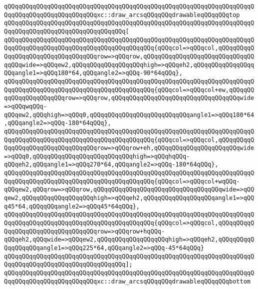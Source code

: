 \verb|qQQqqQQqqQQqqQQqqQQqqQQqqQQqqQQqqQQqqQQqqQQqqQQqqQQqqQQqqQQqqQQqqQQqqQQqqQQqqQQqqQQqqQQqqQQqqQQqxc::draw_arcsqQQqqQQqdrawableqQQqqQQqtop|\newline
\verb|qQQqqQQqqQQqqQQqqQQqqQQqqQQqqQQqqQQqqQQqqQQqqQQqqQQqqQQqqQQqqQQqqQQqqQQqqQQqqQQqqQQqqQQqqQQqqQQqqQQqqQQq[|\newline
\verb|qQQqqQQqqQQqqQQqqQQqqQQqqQQqqQQqqQQqqQQqqQQqqQQqqQQqqQQqqQQqqQQqqQQqqQQqqQQqqQQqqQQqqQQqqQQqqQQqqQQqqQQqqQQqqQQq{qQQqcol=>qQQqcol,qQQqqQQqqQQqqQQqqQQqqQQqqQQqqQQqqQQqrow=>qQQqrow,qQQqqQQqqQQqqQQqqQQqqQQqqQQqqQQqqQQqwide=>qQQqew2,qQQqqQQqqQQqqQQqqQQqhigh=>qQQqeh2,qQQqqQQqqQQqqQQqqQQqangle1=>qQQq180*64,qQQqangle2=>qQQq-90*64qQQq},|\newline
\verb|qQQqqQQqqQQqqQQqqQQqqQQqqQQqqQQqqQQqqQQqqQQqqQQqqQQqqQQqqQQqqQQqqQQqqQQqqQQqqQQqqQQqqQQqqQQqqQQqqQQqqQQqqQQqqQQq{qQQqcol=>qQQqcol+ew,qQQqqQQqqQQqqQQqqQQqqQQqrow=>qQQqrow,qQQqqQQqqQQqqQQqqQQqqQQqqQQqqQQqqQQqwide=>qQQqwqQQq-qQQqew2,qQQqhigh=>qQQq0,qQQqqQQqqQQqqQQqqQQqqQQqqQQqangle1=>qQQq180*64,qQQqangle2=>qQQq-180*64qQQq},|\newline
\verb|qQQqqQQqqQQqqQQqqQQqqQQqqQQqqQQqqQQqqQQqqQQqqQQqqQQqqQQqqQQqqQQqqQQqqQQqqQQqqQQqqQQqqQQqqQQqqQQqqQQqqQQqqQQqqQQq{qQQqcol=>qQQqcol,qQQqqQQqqQQqqQQqqQQqqQQqqQQqqQQqqQQqrow=>qQQqrow+eh,qQQqqQQqqQQqqQQqqQQqqQQqwide=>qQQq0,qQQqqQQqqQQqqQQqqQQqqQQqqQQqhigh=>qQQqhqQQq-qQQqeh2,qQQqangle1=>qQQq270*64,qQQqangle2=>qQQq-180*64qQQq},|\newline
\verb|qQQqqQQqqQQqqQQqqQQqqQQqqQQqqQQqqQQqqQQqqQQqqQQqqQQqqQQqqQQqqQQqqQQqqQQqqQQqqQQqqQQqqQQqqQQqqQQqqQQqqQQqqQQqqQQq{qQQqcol=>qQQqcol+wqQQq-qQQqew2,qQQqrow=>qQQqrow,qQQqqQQqqQQqqQQqqQQqqQQqqQQqqQQqqQQqwide=>qQQqew2,qQQqqQQqqQQqqQQqqQQqhigh=>qQQqeh2,qQQqqQQqqQQqqQQqqQQqangle1=>qQQq45*64,qQQqqQQqangle2=>qQQq45*64qQQq},|\newline
\verb|qQQqqQQqqQQqqQQqqQQqqQQqqQQqqQQqqQQqqQQqqQQqqQQqqQQqqQQqqQQqqQQqqQQqqQQqqQQqqQQqqQQqqQQqqQQqqQQqqQQqqQQqqQQqqQQq{qQQqcol=>qQQqcol,qQQqqQQqqQQqqQQqqQQqqQQqqQQqqQQqqQQqrow=>qQQqrow+hqQQq-qQQqeh2,qQQqwide=>qQQqew2,qQQqqQQqqQQqqQQqqQQqhigh=>qQQqeh2,qQQqqQQqqQQqqQQqqQQqangle1=>qQQq225*64,qQQqangle2=>qQQq-45*64qQQq}|\newline
\verb|qQQqqQQqqQQqqQQqqQQqqQQqqQQqqQQqqQQqqQQqqQQqqQQqqQQqqQQqqQQqqQQqqQQqqQQqqQQqqQQqqQQqqQQqqQQqqQQqqQQqqQQq];|\newline
\newline
\verb|qQQqqQQqqQQqqQQqqQQqqQQqqQQqqQQqqQQqqQQqqQQqqQQqqQQqqQQqqQQqqQQqqQQqqQQqqQQqqQQqqQQqqQQqqQQqqQQqxc::draw_arcsqQQqqQQqdrawableqQQqqQQqbottom|\newline
